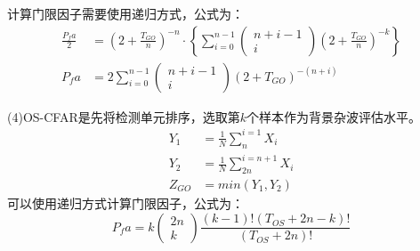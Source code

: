 计算门限因子需要使用递归方式，公式为：
\begin{equation}
	\begin{split}
		\frac{P_fa}{2} &=  \left(2+\frac{T_{GO}}{n} \right)^{-n} 
		\cdot  \left\{ \sum_{i=0}^{n-1}\begin{pmatrix}  n+i-1\\i \end{pmatrix} \left(2+ \frac{T_{GO}}{n} \right)^{-k} \right\} \\
		P_fa &= 2\sum_{i=0}^{n-1}\begin{pmatrix}  n+i-1\\i \end{pmatrix}  \left(2+T_{GO} \right)^{-(n+i)}
	\end{split}
\end{equation}
\par
(4)OS-CFAR是先将检测单元排序，选取第$k$个样本作为背景杂波评估水平。
\begin{equation}
	\begin{split}
		Y_1 &= \frac{1}{N} \sum_{n}^{i=1}X_i \\
		Y_2 &= \frac{1}{N} \sum_{2n}^{i=n+1}X_i\\
		Z_{GO} &= min\left(Y_1, Y_2\right)
	\end{split}
\end{equation}
可以使用递归方式计算门限因子，公式为：
\begin{equation}
	P_fa = k \begin{pmatrix}  2n \\k \end{pmatrix} \frac{\left( k-1\right)! \left(T_{OS} + 2n-k \right)! }{\left( T_{OS} + 2n \right)!}
\end{equation}
\par

